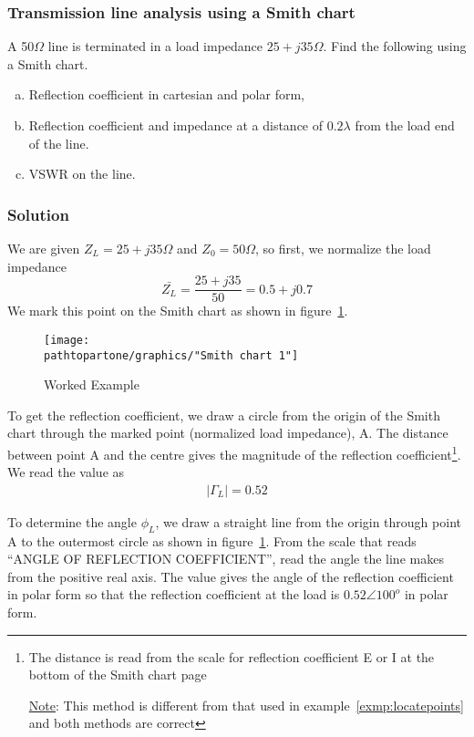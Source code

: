\begin{exmp}
\subsubsection*{Transmission line analysis using a Smith chart}
A 50$\Omega$ line is terminated in a load impedance $25+j35\Omega$. Find the following using a Smith chart.
\begin{enumerate}[(a)]
\item Reflection coefficient in cartesian and polar form,
\item Reflection coefficient and impedance at a distance of $0.2\lambda$ from the load end of the line.
\item VSWR on the line.
\end{enumerate}

\subsubsection*{Solution}
We are given $Z_{L}=25+j35\varOmega$ and $Z_{0}=50\varOmega$, so first, we normalize the load impedance
\begin{dmath*}
\bar{Z_{L}}=\frac{25+j35}{50}=0.5+j0.7
\end{dmath*}
We mark this point on the Smith chart as shown in figure~\ref{fig:workedexample2}.
\begin{figure}[h]
\centering
\texttt{[image: \\pathtopartone/graphics/"Smith chart 1"]}
\caption{Worked Example}
\label{fig:workedexample2}
\end{figure}

To get the reflection coefficient, we draw a circle from the origin of the Smith chart through the marked point (normalized load impedance), A. The distance between point A and the centre gives the magnitude of the reflection coefficient\footnote{
The distance is read from the scale for reflection coefficient E or I at the bottom of the Smith chart page

\underline{Note}: This method is different from that used in example~\ref{exmp:locatepoints} and both methods are correct
}. We read the value as
\begin{align*}
|\Gamma_{L}| = 0.52
\end{align*}

To determine the angle $\phi_{L}$, we draw a straight line from the origin through point A to the outermost circle as shown in figure~\ref{fig:workedexample2}. From the scale that reads \textquotedblleft ANGLE OF REFLECTION COEFFICIENT\textquotedblright\;, read the angle the line makes from the positive real axis. The value gives the angle of the reflection coefficient in polar form so that the reflection coefficient at the load is $0.52\angle100^o$ in polar form.


\end{exmp}
